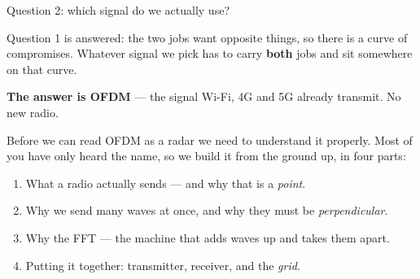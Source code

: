 \begin{frame}{Question 2: which signal do we actually use?}
  \vspace{0.3em}
  {\small Question 1 is answered: the two jobs want opposite things, so there is a
   curve of compromises. Whatever signal we pick has to carry \textbf{both} jobs and
   sit somewhere on that curve.\par}

  \vspace{0.45em}
  {\large\textbf{The answer is OFDM}  --- the signal Wi-Fi, 4G and 5G already transmit. No new radio.\par}

  \vspace{0.45em}
  {\small Before we can read OFDM as a radar we need to understand it properly. Most
   of you have only heard the name, so we build it from the ground up, in four parts:\par}
  \vspace{0.2em}
  {\small
  \begin{enumerate}\itemsep0pt
    \item What a radio actually sends --- and why that is a \emph{point}.
    \item Why we send many waves at once, and why they must be \emph{perpendicular}.
    \item Why the FFT --- the machine that adds waves up and takes them apart.
    \item Putting it together: transmitter, receiver, and the \emph{grid}.
  \end{enumerate}}

\end{frame}

